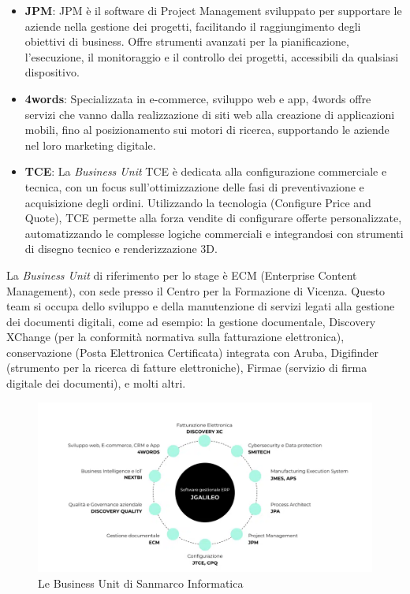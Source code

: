 \begin{itemize}
    \item \textbf{JPM}: JPM è il software di Project Management sviluppato per supportare le aziende nella gestione dei progetti, facilitando il raggiungimento degli obiettivi di business. Offre strumenti avanzati per la pianificazione, l'esecuzione, il monitoraggio e il controllo dei progetti, accessibili da qualsiasi dispositivo.
    \item \textbf{4words}: Specializzata in e-commerce, sviluppo web e app, 4words offre servizi che vanno dalla realizzazione di siti web alla creazione di applicazioni mobili, fino al posizionamento sui motori di ricerca, supportando le aziende nel loro marketing digitale.
    \item \textbf{TCE}: La \emph{Business Unit} TCE è dedicata alla configurazione commerciale e tecnica, con un focus sull'ottimizzazione delle fasi di preventivazione e acquisizione degli ordini. Utilizzando la tecnologia  (Configure Price and Quote), TCE permette alla forza vendite di configurare offerte personalizzate, automatizzando le complesse logiche commerciali e integrandosi con strumenti di disegno tecnico e renderizzazione 3D.
\end{itemize}

La \emph{Business Unit} di riferimento per lo stage è ECM (Enterprise Content Management), con sede presso il Centro per la Formazione di Vicenza. Questo team si occupa dello sviluppo e della manutenzione di servizi legati alla gestione dei documenti digitali, come ad esempio: la gestione documentale, Discovery XChange (per la conformità normativa sulla fatturazione elettronica), conservazione  (Posta Elettronica Certificata)
 integrata con Aruba, Digifinder (strumento per la ricerca di fatture elettroniche), Firmae (servizio di firma digitale dei documenti), e molti altri.

\begin{figure}[h!]
    \centering
    \includegraphics[width=0.8\columnwidth]{img/business_unit.png}
    \caption{Le Business Unit di Sanmarco Informatica}
    \label{fig:business_unit}
\end{figure}


